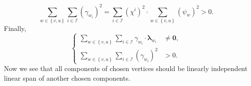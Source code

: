 \begin{equation*}
  \sum_{w \in \left\{ v, u \right\}}
  \sum_{i \in \mathcal{I}}
    \left( \gamma_{w_i} \right)^2
  =
  \sum_{i \in \mathcal{I}}
    \left( \chi^i \right)^2 \cdot
  \sum_{w \in \left\{ v, u \right\}}
    \left( \psi_w \right)^2
  > 0.
\end{equation*}
Finally,
\begin{equation}\label{eq:components:independent}
  \left\{\begin{aligned}
    \sum\limits_{w \in \left\{ v, u \right\}}
    \sum\limits_{i \in \mathcal{I}}
      \gamma_{w_i} \cdot \pmb{\lambda}_{w_i}
    &\neq \pmb{0}, \\
    \sum\limits_{w \in \left\{ v, u \right\}}
    \sum\limits_{i \in \mathcal{I}}
      \left( \gamma_{w_i} \right)^2 &> 0.
  \end{aligned}\right.
\end{equation}
Now we see that all components of chosen vertices
should be linearly independent linear span of another chosen components.

